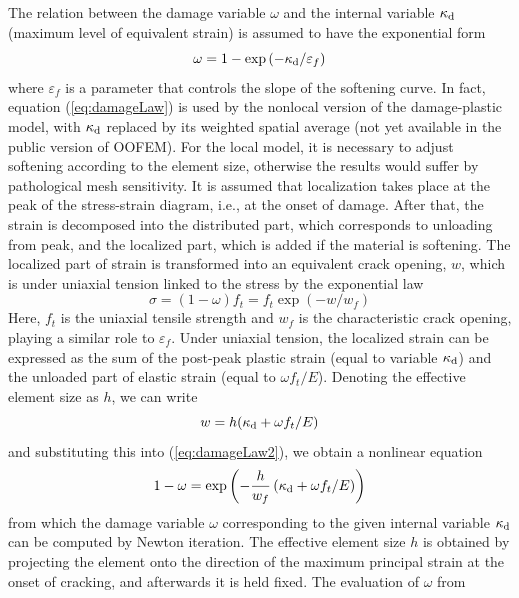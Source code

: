 \documentclass[a4paper]{article}
\begin{document}
The relation between the damage variable $\omega$ and the internal variable $\kappa_{\rm d}$ (maximum level of equivalent strain) is assumed to have the exponential form 
\begin{equation} \label{eq:damageLaw}
\omega = 
1-\exp\left(-\kappa_{\rm d}/\varepsilon_f\right) 
\end{equation}
where $\varepsilon_f$ is a parameter that controls the slope of the softening curve. In fact, equation (\ref{eq:damageLaw}) is used by the nonlocal version
of the damage-plastic model, with $\kappa_{\rm d}$ replaced by its weighted
spatial average (not yet available in the public version of OOFEM).
For the local model, it is necessary to adjust softening according
to the element size, otherwise the results would suffer by pathological 
mesh sensitivity. It is assumed that localization takes place at the
peak of the stress-strain diagram, i.e., at the onset of damage. 
After that, the strain is decomposed into the distributed
part, which corresponds to unloading from peak, and the localized part,
which is added if the material is softening.
The  localized part of strain 
is transformed into an equivalent crack opening, $w$, which is 
under uniaxial tension linked
to the stress by the exponential law 
\begin{equation} \label{eq:damageLaw2}
\sigma = (1-\omega) f_t =
f_t \exp\left(-w/w_f\right) 
\end{equation}
Here, $f_t$ is the uniaxial tensile strength and $w_f$ is the characteristic
crack opening, playing a similar role to $\varepsilon_f$.
Under uniaxial tension, the localized strain can be expressed as the sum
of the post-peak plastic strain (equal to variable $\kappa_{\rm d}$) 
and the unloaded part of elastic strain (equal to $\omega f_t/E$).
Denoting the effective element size as $h$, we can write
\begin{equation}
w = h(\kappa_{\rm d}+\omega f_t/E)
\end{equation}
and substituting this into (\ref{eq:damageLaw2}), we obtain a nonlinear
equation
\begin{equation}\label{eq:damageLaw4}
1-\omega = \exp\left(-\frac{h}{w_f}\left(\kappa_{\rm d}+\omega f_t/E\right)\right)
\end{equation}
from which the damage variable $\omega$ corresponding to the given internal
variable $\kappa_{\rm d}$ can be computed by Newton iteration.
The effective element size $h$ is obtained by projecting the element onto
the direction of the maximum principal strain at the onset of cracking,
and afterwards it is held fixed. The evaluation of $\omega$ from
\end{document}
